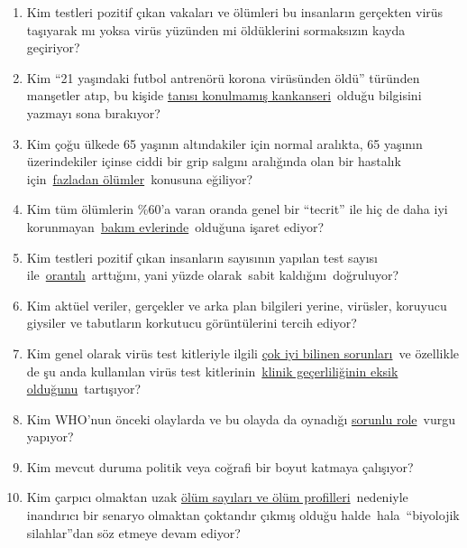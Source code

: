\begin{enumerate}
\def\labelenumi{\arabic{enumi}.}
\tightlist
\item
  Kim testleri pozitif çıkan vakaları ve ölümleri bu insanların
  gerçekten virüs taşıyarak mı yoksa virüs yüzünden mi öldüklerini
  sormaksızın kayda geçiriyor?
\item
  Kim ``21 yaşındaki futbol antrenörü korona virüsünden öldü'' türünden
  manşetler atıp, bu kişide
  \href{https://sports.yahoo.com/spanish-football-coach-francisco-garcia-163153573.html}{tanısı
  konulmamış kankanseri}~olduğu bilgisini yazmayı sona bırakıyor?
\item
  Kim çoğu ülkede 65 yaşının altındakiler için normal aralıkta, 65
  yaşının üzerindekiler içinse ciddi bir grip salgını aralığında olan
  bir hastalık için~\href{https://www.euromomo.eu/index.html}{fazladan
  ölümler}~konusuna eğiliyor?
\item
  Kim tüm ölümlerin \%60'a varan oranda genel bir ``tecrit'' ile hiç de
  daha iyi
  korunmayan~\href{https://ltccovid.org/2020/04/12/mortality-associated-with-covid-19-outbreaks-in-care-homes-early-international-evidence/}{bakım
  evlerinde}~olduğuna işaret ediyor?
\item
  Kim testleri pozitif çıkan insanların sayısının yapılan test sayısı
  ile~\href{https://multipolar-magazin.de/artikel/coronavirus-irrefuhrung-fallzahlen}{orantılı}~arttığını,
  yani yüzde olarak~sabit kaldığını~doğruluyor?
\item
  Kim aktüel veriler, gerçekler ve arka plan bilgileri yerine, virüsler,
  koruyucu giysiler ve tabutların korkutucu görüntülerini tercih ediyor?
\item
  Kim genel olarak virüs test kitleriyle ilgili
  \href{https://www.ncbi.nlm.nih.gov/pmc/articles/PMC2095096/}{çok iyi
  bilinen sorunları}~ve özellikle de şu anda kullanılan virüs test
  kitlerinin~\href{https://www.creative-diagnostics.com/sars-cov-2-coronavirus-multiplex-rt-qpcr-kit-277854-457.htm}{klinik
  geçerliliğinin eksik olduğunu}~tartışıyor?
\item
  Kim WHO'nun önceki olaylarda ve bu olayda da oynadığı
  \href{https://www.forbes.com/2010/02/05/world-health-organization-swine-flu-pandemic-opinions-contributors-michael-fumento.html\#208eef4048e8}{sorunlu
  role}~vurgu yapıyor?
\item
  Kim mevcut duruma politik veya coğrafi bir boyut katmaya çalışıyor?
\item
  Kim çarpıcı olmaktan uzak
  \href{https://www.statnews.com/2020/03/17/a-fiasco-in-the-making-as-the-coronavirus-pandemic-takes-hold-we-are-making-decisions-without-reliable-data/}{ölüm
  sayıları ve ölüm profilleri}~nedeniyle inandırıcı bir senaryo olmaktan
  çoktandır çıkmış olduğu halde~hala~``biyolojik silahlar''dan söz
  etmeye devam ediyor?
\end{enumerate}

